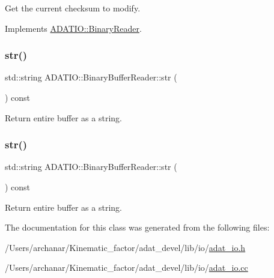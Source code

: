Get the current checksum to modify. 



Implements \mbox{\hyperlink{classADATIO_1_1BinaryReader_a33d291f073bf2e1f71f6bdbe40ce343a}{A\+D\+A\+T\+I\+O\+::\+Binary\+Reader}}.

\mbox{\label{classADATIO_1_1BinaryBufferReader_a1e960fee8100fbe85f706b45870d95e1}} 
\subsubsection{\texorpdfstring{str()}{str()}\hspace{0.1cm}{\footnotesize\ttfamily [1/2]}}
{\footnotesize\ttfamily std\+::string A\+D\+A\+T\+I\+O\+::\+Binary\+Buffer\+Reader\+::str (\begin{DoxyParamCaption}{ }\end{DoxyParamCaption}) const}



Return entire buffer as a string. 

\mbox{\label{classADATIO_1_1BinaryBufferReader_a1e960fee8100fbe85f706b45870d95e1}} 
\subsubsection{\texorpdfstring{str()}{str()}\hspace{0.1cm}{\footnotesize\ttfamily [2/2]}}
{\footnotesize\ttfamily std\+::string A\+D\+A\+T\+I\+O\+::\+Binary\+Buffer\+Reader\+::str (\begin{DoxyParamCaption}{ }\end{DoxyParamCaption}) const}



Return entire buffer as a string. 



The documentation for this class was generated from the following files\+:\begin{DoxyCompactItemize}
\item 
/\+Users/archanar/\+Kinematic\+\_\+factor/adat\+\_\+devel/lib/io/\mbox{\hyperlink{lib_2io_2adat__io_8h}{adat\+\_\+io.\+h}}\item 
/\+Users/archanar/\+Kinematic\+\_\+factor/adat\+\_\+devel/lib/io/\mbox{\hyperlink{adat__io_8cc}{adat\+\_\+io.\+cc}}\end{DoxyCompactItemize}
